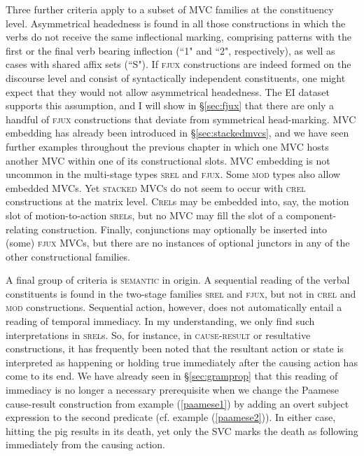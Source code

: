 Three further criteria apply to a subset of MVC families at the constituency level. Asymmetrical headedness is found in all those constructions in which the verbs do not receive the same inflectional marking, comprising patterns with the first or the final verb bearing inflection (``1" and ``2", respectively), as well as cases with shared affix sets (``S"). If \textsc{fjux} constructions are indeed formed on the discourse level and consist of syntactically independent constituents, one might expect that they would not allow asymmetrical headedness. The EI dataset supports this assumption, and I will show in §\ref{sec:fjux} that there are only a handful of \textsc{fjux} constructions that deviate from symmetrical head-marking. MVC embedding has already been introduced in §\ref{sec:stackedmvcs}, and we have seen further examples throughout the previous chapter in which one MVC hosts another MVC within one of its constructional slots. MVC embedding is not uncommon in the multi-stage types \textsc{srel} and \textsc{fjux}. Some \textsc{mod} types also allow embedded MVCs. Yet \textsc{stacked MVCs} do not seem to occur with \textsc{crel} constructions at the matrix level. \textsc{Crel}s may be embedded into, say, the motion slot of motion-to-action \textsc{srel}s, but no MVC may fill the slot of a component-relating construction. Finally, conjunctions may optionally be inserted into (some) \textsc{fjux} MVCs, but there are no instances of optional junctors in any of the other constructional families.

A final group of criteria is \textsc{semantic} in origin. A sequential reading of the verbal constituents is found in the two-stage families \textsc{srel} and \textsc{fjux}, but not in \textsc{crel} and \textsc{mod} constructions. Sequential action, however, does not automatically entail a reading of temporal immediacy. In my understanding, we only find such interpretations in \textsc{srel}s. So, for instance, in \textsc{cause-result} or resultative constructions, it has frequently been noted that the resultant action or state is interpreted as happening or holding true immediately after the causing action has come to its end. We have already seen in §\ref{sec:gramprop} that this reading of immediacy is no longer a necessary prerequisite when we change the Paamese cause-result construction from example (\ref{paamese1}) by adding an overt subject expression to the second predicate (cf. example (\ref{paamese2})). In either case, hitting the pig results in its death, yet only the SVC marks the death as following immediately from the causing action. 

